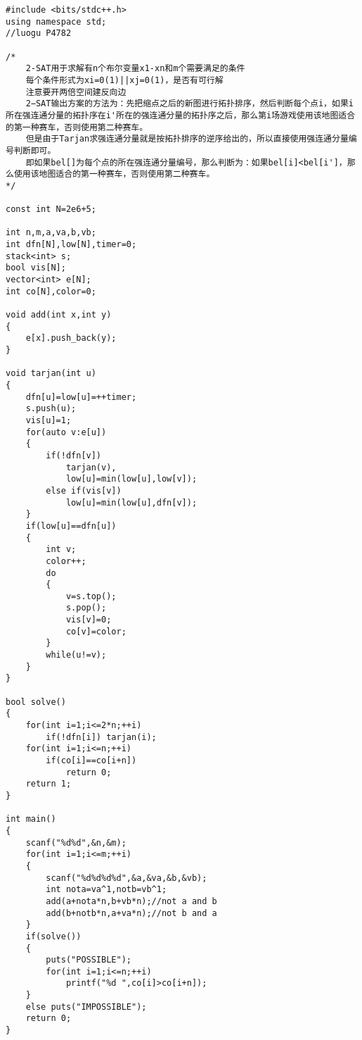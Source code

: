 ﻿\begin{lstlisting}
#include <bits/stdc++.h>
using namespace std;
//luogu P4782

/*
	2-SAT用于求解有n个布尔变量x1-xn和m个需要满足的条件
	每个条件形式为xi=0(1)||xj=0(1)，是否有可行解
	注意要开两倍空间建反向边
	2−SAT输出方案的方法为：先把缩点之后的新图进行拓扑排序，然后判断每个点i，如果i所在强连通分量的拓扑序在i'所在的强连通分量的拓扑序之后，那么第i场游戏使用该地图适合的第一种赛车，否则使用第二种赛车。
	但是由于Tarjan求强连通分量就是按拓扑排序的逆序给出的，所以直接使用强连通分量编号判断即可。
	即如果bel[]为每个点的所在强连通分量编号，那么判断为：如果bel[i]<bel[i']，那么使用该地图适合的第一种赛车，否则使用第二种赛车。
*/

const int N=2e6+5;

int n,m,a,va,b,vb;
int dfn[N],low[N],timer=0;
stack<int> s;
bool vis[N];
vector<int> e[N];
int co[N],color=0;

void add(int x,int y)
{
	e[x].push_back(y);
}

void tarjan(int u)
{
	dfn[u]=low[u]=++timer;
	s.push(u);
	vis[u]=1;
	for(auto v:e[u])
	{
		if(!dfn[v])
			tarjan(v),
			low[u]=min(low[u],low[v]);
		else if(vis[v])
			low[u]=min(low[u],dfn[v]);
	}
	if(low[u]==dfn[u])
	{
		int v;
		color++;
		do
		{
			v=s.top();
			s.pop();
			vis[v]=0;
			co[v]=color;
		}
		while(u!=v);
	}
}

bool solve()
{
	for(int i=1;i<=2*n;++i)
		if(!dfn[i]) tarjan(i);
	for(int i=1;i<=n;++i)
		if(co[i]==co[i+n])
			return 0;
	return 1;
}

int main()
{
	scanf("%d%d",&n,&m);
	for(int i=1;i<=m;++i)
	{
		scanf("%d%d%d%d",&a,&va,&b,&vb);
		int nota=va^1,notb=vb^1;
		add(a+nota*n,b+vb*n);//not a and b
		add(b+notb*n,a+va*n);//not b and a
	}
	if(solve())
	{
		puts("POSSIBLE");
		for(int i=1;i<=n;++i)
			printf("%d ",co[i]>co[i+n]);
	}
	else puts("IMPOSSIBLE");
	return 0;
}
\end{lstlisting}